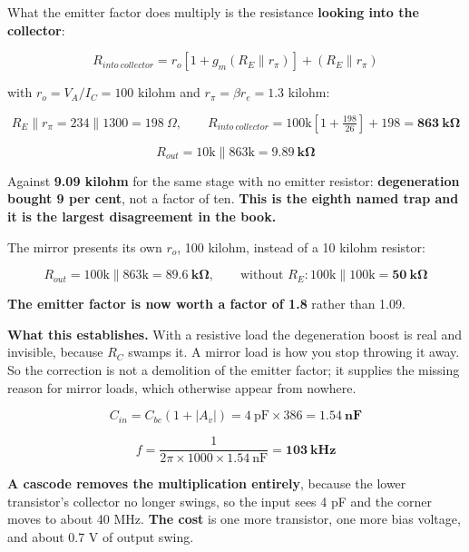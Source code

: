 What the emitter factor does multiply is the resistance \textbf{looking into the collector}:

\[
  R_{into\ collector} = r_o\left[1 + g_m(R_E \parallel r_\pi)\right] + (R_E \parallel r_\pi)
\]

with $r_o = V_A/I_C = 100$ kilohm and $r_\pi = \beta r_e = 1.3$ kilohm:

\[
  R_E \parallel r_\pi = 234 \parallel 1300 = 198\ \Omega, \qquad
  R_{into\ collector} = 100\text{k}\left[1 + \tfrac{198}{26}\right] + 198 = \mathbf{863\ \text{k}\Omega}
\]

\[
  R_{out} = 10\text{k} \parallel 863\text{k} = \mathbf{9.89\ \text{k}\Omega}
\]

Against \textbf{9.09 kilohm} for the same stage with no emitter resistor: \textbf{degeneration bought 9 per cent}, not a factor of ten. \textbf{This is the eighth named trap and it is the largest disagreement in the book.}


The mirror presents its own $r_o$, 100 kilohm, instead of a 10 kilohm resistor:

\[
  R_{out} = 100\text{k} \parallel 863\text{k} = \mathbf{89.6\ \text{k}\Omega}, \qquad
  \text{without } R_E: 100\text{k} \parallel 100\text{k} = \mathbf{50\ \text{k}\Omega}
\]

\textbf{The emitter factor is now worth a factor of 1.8} rather than 1.09.

\textbf{What this establishes.} With a resistive load the degeneration boost is real and invisible, because $R_C$ swamps it. A mirror load is how you stop throwing it away. So the correction is not a demolition of the emitter factor; it supplies the missing reason for mirror loads, which otherwise appear from nowhere.


\[
  C_{in} = C_{bc}(1 + |A_v|) = 4\ \text{pF} \times 386 = \mathbf{1.54\ \text{nF}}
\]

\[
  f = \frac{1}{2\pi \times 1000 \times 1.54\ \text{nF}} = \mathbf{103\ \text{kHz}}
\]

\textbf{A cascode removes the multiplication entirely}, because the lower transistor's collector no longer swings, so the input sees 4 pF and the corner moves to about 40 MHz. \textbf{The cost} is one more transistor, one more bias voltage, and about 0.7 V of output swing.

